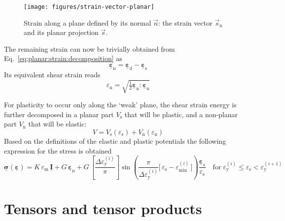 \documentclass[times,namecite]{goose-article}
\newcommand\T[1]{\underline{\bm{{#1}}}}
\begin{document}
\begin{figure}[htp]
    \centering
    \texttt{[image: figures/strain-vector-planar]}
    \caption{Strain along a plane defined by its normal $\vec{n}$: the strain vector $\vec{s}_\mathrm{n}$ and its planar projection $\vec{s}$.}
    \label{fig:strain-vector-planar}
\end{figure}

The remaining strain can now be trivially obtained from Eq.~\eqref{eq:planar:strain:decomposition} as
\begin{equation}
    \T{\varepsilon}_\mathrm{n} = \T{\varepsilon}_\mathrm{d} - \T{\varepsilon}_\mathrm{s}
\end{equation}
Its equivalent shear strain reads
\begin{equation}
    \varepsilon_\mathrm{n} = \sqrt{ \tfrac{1}{2} \T{\varepsilon}_\mathrm{n} : \T{\varepsilon}_\mathrm{n} }
\end{equation}

For plasticity to occur only along the `weak' plane, the shear strain energy is further decomposed in a planar part $V_\mathrm{s}$ that will be plastic, and a non-planar part $V_\mathrm{n}$ that will be elastic:
\begin{equation}
    V
    =
    V_\mathrm{s} ( \varepsilon_\mathrm{s} )
    +
    V_\mathrm{n} ( \varepsilon_\mathrm{n} )
\end{equation}
Based on the definitions of the elastic and plastic potentials the following expression for the stress is obtained
\begin{equation}
    \T{\sigma} ( \T{\varepsilon} )
    =
    K \, \varepsilon_\mathrm{m} \, \T{I}
    +
    G \, \T{\varepsilon}_\mathrm{n}
    +
    G \,
    \left[ \frac{\Delta \varepsilon_\mathrm{y}^{(i)}}{\pi} \right]
    \sin \left(
      \frac{ \pi }{ \Delta \varepsilon_\mathrm{y}^{(i)} }
      \Big[\, \varepsilon_\mathrm{s} - \varepsilon_\mathrm{min}^{(i)} \,\Big]
    \right)
    \frac{\T{\varepsilon}_\mathrm{s}}{\varepsilon_\mathrm{s}}
    \quad
    \mathrm{for}
    \;
    \varepsilon_\mathrm{y}^{(i)} \leq \varepsilon_\mathrm{s} < \varepsilon_\mathrm{y}^{(i+1)}
\end{equation}

\appendix

\vfill\newpage

\section{Tensors and tensor products}
\label{sec:nomenclature:tensor}
\end{document}
